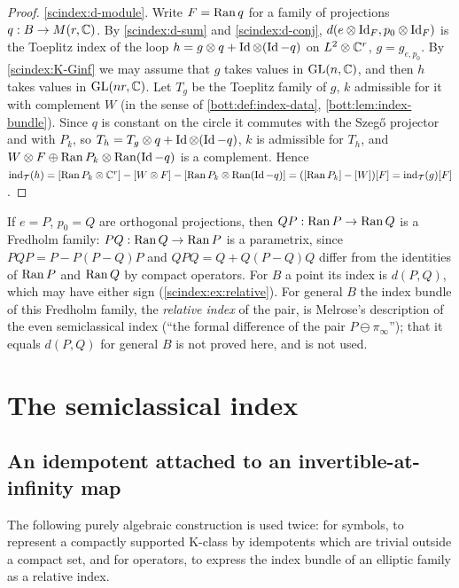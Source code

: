 \begin{proof}
  \ref{scindex:d-module}. Write $F=\operatorname{Ran} q$ for a family of projections
  $q:B\to M(r,\mathbb{C})$. By \ref{scindex:d-sum} and \ref{scindex:d-conj},
  $d(e\otimes\operatorname{Id}_F,p_0\otimes\operatorname{Id}_F)$ is the Toeplitz index of the loop
  $h=g\otimes q+\operatorname{Id}\otimes(\operatorname{Id}-q)$ on $L^2\otimes\mathbb{C}^r$, $g=g_{e,p_0}$. By
  \ref{scindex:K-Ginf} we may assume that $g$ takes values in $\operatorname{GL}(n,\mathbb{C})$, and
  then $h$ takes values in $\operatorname{GL}(nr,\mathbb{C})$. Let $T_g$ be the Toeplitz family of $g$,
  $k$ admissible for it with complement $W$ (in the sense of \cref{bott:def:index-data}, \cref{bott:lem:index-bundle}).
  Since $q$ is constant on the circle it commutes with the Szeg\H{o} projector
  and with $P_k$, so $T_h=T_g\otimes q+\operatorname{Id}\otimes(\operatorname{Id}-q)$, $k$ is admissible for
  $T_h$, and $W\otimes F\oplus\operatorname{Ran} P_k\otimes\operatorname{Ran}(\operatorname{Id}-q)$ is a complement. Hence
  $\operatorname{ind}_{\mathcal T}(h)=[\operatorname{Ran} P_k\otimes\mathbb{C}^r]-[W\otimes F]-[\operatorname{Ran} P_k\otimes\operatorname{Ran}(\operatorname{Id}-q)]
  =([\operatorname{Ran} P_k]-[W])[F]=\operatorname{ind}_{\mathcal T}(g)[F]$.
\end{proof}

\begin{remark}\label{scindex:rem:relative-projections}
  If $e=P$, $p_0=Q$ are orthogonal projections, then $QP:\operatorname{Ran} P\to\operatorname{Ran} Q$ is a
  Fredholm family: $PQ:\operatorname{Ran} Q\to\operatorname{Ran} P$ is a parametrix, since
  $PQP=P-P(P-Q)P$ and $QPQ=Q+Q(P-Q)Q$ differ from the identities of $\operatorname{Ran} P$ and
  $\operatorname{Ran} Q$ by compact operators. For $B$ a point its index is $d(P,Q)$, which may
  have either sign (\cref{scindex:ex:relative}). For general $B$ the index
  bundle of this Fredholm family, the \emph{relative index} of the pair, is
  Melrose's description of the even semiclassical index (``the formal difference
  of the pair $P\ominus\pi_\infty$''); that it equals $d(P,Q)$ for general $B$
  is not proved here, and is not used.
\end{remark}

\section{The semiclassical index}\label{scindex:sec:sl-index}

\subsection{An idempotent attached to an invertible-at-infinity map}
The following purely algebraic construction is used twice: for symbols, to
represent a compactly supported K-class by idempotents which are trivial outside
a compact set, and for operators, to express the index bundle of an elliptic
family as a relative index.

